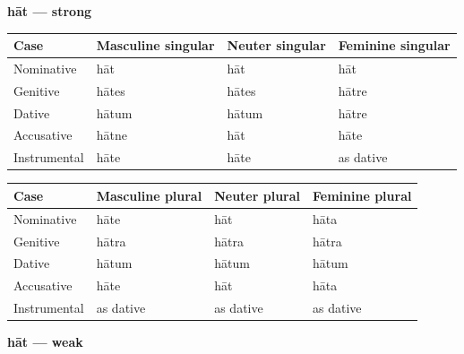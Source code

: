 \textbf{hāt — strong}

\par\begingroup
\fontsize{10.5}{13.2}\selectfont
\setlength{\LTleft}{0pt}\setlength{\LTright}{\fill}
\noindent
\begin{tabular}{@{}>{\raggedright\arraybackslash}p{22.0mm}>{\raggedright\arraybackslash}p{31.188mm}>{\raggedright\arraybackslash}p{31.188mm}>{\raggedright\arraybackslash}p{31.188mm}@{}}
\toprule
\textbf{Case} & \textbf{Masculine singular} & \textbf{Neuter singular} & \textbf{Feminine singular} \\
\midrule
Nominative & hāt & hāt & hāt \\
Genitive & hātes & hātes & hātre \\
Dative & hātum & hātum & hātre \\
Accusative & hātne & hāt & hāte \\
Instrumental & hāte & hāte & as dative \\
\bottomrule
\end{tabular}
\par\endgroup
\par\addvspace{5pt}
\par\begingroup
\fontsize{10.5}{13.2}\selectfont
\setlength{\LTleft}{0pt}\setlength{\LTright}{\fill}
\noindent
\begin{tabular}{@{}>{\raggedright\arraybackslash}p{22.0mm}>{\raggedright\arraybackslash}p{31.188mm}>{\raggedright\arraybackslash}p{31.188mm}>{\raggedright\arraybackslash}p{31.188mm}@{}}
\toprule
\textbf{Case} & \textbf{Masculine plural} & \textbf{Neuter plural} & \textbf{Feminine plural} \\
\midrule
Nominative & hāte & hāt & hāta \\
Genitive & hātra & hātra & hātra \\
Dative & hātum & hātum & hātum \\
Accusative & hāte & hāt & hāta \\
Instrumental & as dative & as dative & as dative \\
\bottomrule
\end{tabular}
\par\endgroup

\textbf{hāt — weak}

